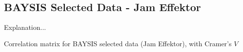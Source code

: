 \begin{appendices}
    
    \tocless\section{BAYSIS Selected Data - Jam Effektor}
    \label{appendix_baysis_selected_duringJam}
    
    Explanation...
    
    
    
    \begin{sidewaystable}
    	\tiny
    	\setlength{\tabcolsep}{2pt}
    	\centering
    	
    	\caption{Correlation matrix for BAYSIS selected data (Jam Effektor), with Cramer's $V$}
    	\label{table:appendix_correlation_matrix_selected_startJam_cramers}
    \end{sidewaystable}
    

\end{appendices}
